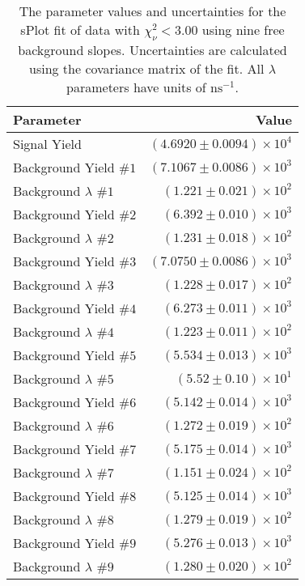 
\begin{table}[ht]
    \begin{center}
        \begin{tabular}{lr}\toprule
            Parameter & Value \\\midrule
            Signal Yield & $(4.6920 \pm 0.0094) \times 10^{4}$ \\
            Background Yield $\#1$ & $(7.1067 \pm 0.0086) \times 10^{3}$ \\
            Background $\lambda$ $\#1$ & $(1.221 \pm 0.021) \times 10^{2}$ \\
            Background Yield $\#2$ & $(6.392 \pm 0.010) \times 10^{3}$ \\
            Background $\lambda$ $\#2$ & $(1.231 \pm 0.018) \times 10^{2}$ \\
            Background Yield $\#3$ & $(7.0750 \pm 0.0086) \times 10^{3}$ \\
            Background $\lambda$ $\#3$ & $(1.228 \pm 0.017) \times 10^{2}$ \\
            Background Yield $\#4$ & $(6.273 \pm 0.011) \times 10^{3}$ \\
            Background $\lambda$ $\#4$ & $(1.223 \pm 0.011) \times 10^{2}$ \\
            Background Yield $\#5$ & $(5.534 \pm 0.013) \times 10^{3}$ \\
            Background $\lambda$ $\#5$ & $(5.52 \pm 0.10) \times 10^{1}$ \\
            Background Yield $\#6$ & $(5.142 \pm 0.014) \times 10^{3}$ \\
            Background $\lambda$ $\#6$ & $(1.272 \pm 0.019) \times 10^{2}$ \\
            Background Yield $\#7$ & $(5.175 \pm 0.014) \times 10^{3}$ \\
            Background $\lambda$ $\#7$ & $(1.151 \pm 0.024) \times 10^{2}$ \\
            Background Yield $\#8$ & $(5.125 \pm 0.014) \times 10^{3}$ \\
            Background $\lambda$ $\#8$ & $(1.279 \pm 0.019) \times 10^{2}$ \\
            Background Yield $\#9$ & $(5.276 \pm 0.013) \times 10^{3}$ \\
            Background $\lambda$ $\#9$ & $(1.280 \pm 0.020) \times 10^{2}$ \\\bottomrule
        \end{tabular}
        \caption{The parameter values and uncertainties for the sPlot fit of data with $\chi^2_\nu < 3.00$ using nine free background slopes. Uncertainties are calculated using the covariance matrix of the fit. All $\lambda$ parameters have units of $\si{\nano\second}^{-1}$.}\label{tab:splot-fit-results-chisqdof-3.00-free-9}
    \end{center}
\end{table}
